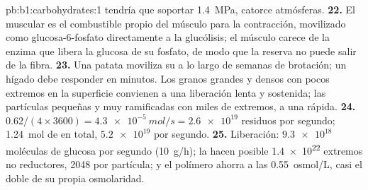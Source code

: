 \begin{solution}{pb:b1:carbohydrates:1}
tendría que soportar \qty{1.4}{MPa}, catorce atmósferas.
\textbf{22.} El  muscular es el combustible propio del músculo para
la contracción, movilizado como glucosa-6-fosfato directamente a la
glucólisis; el músculo carece de la enzima que libera la glucosa de su
fosfato, de modo que la reserva no puede salir de la fibra.
\textbf{23.} Una patata moviliza su  a lo largo de semanas de
brotación; un hígado debe responder en minutos. Los granos grandes y densos
con pocos extremos en la superficie convienen a una liberación lenta y
sostenida; las partículas pequeñas y muy ramificadas con miles de extremos,
a una rápida.
\textbf{24.} $0.62/(4\times 3600) = \qty{4.3e-5}{mol/s} = \num{2.6e19}$
residuos por segundo; \qty{1.24}{mol} de  en total, $\num{5.2e19}$ por
segundo.
\textbf{25.} Liberación: $\num{9.3e18}$ moléculas de glucosa por segundo
(\qty{10}{g/h}); la hacen posible \num{1.4e22} extremos no reductores,
\num{2048} por partícula; y el polímero ahorra a las 
\qty{0.55}{osmol/L}, casi el doble de su propia osmolaridad.
\end{solution}
